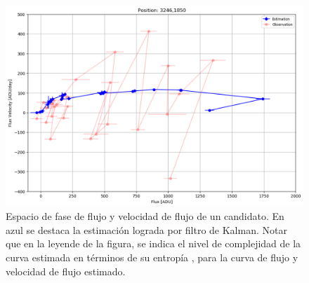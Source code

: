\begin{figure}[h!]
\centering

\includegraphics[scale=.5]{images/space_curve.png}
\caption{Espacio de fase de flujo y velocidad de flujo de un candidato. En azul se destaca la estimaci\'on lograda por filtro de Kalman. Notar que en la leyende de la figura, se indica el nivel de complejidad de la curva estimada en t\'erminos de su entrop\'ia \cite{balestrino}, para la curva de flujo y velocidad de flujo estimado.}
\label{fig:sp_st}
\end{figure}
